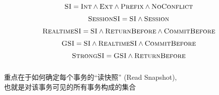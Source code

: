 \begin{frame}{}
  \[
	\textsc{SI} = \textsc{Int} \land \textsc{Ext} \land \textsc{Prefix} \land \textsc{NoConflict}
  \]
\end{frame}

\begin{frame}{}
  \[
	\textsc{SessionSI} = \textsc{SI} \land \textsc{Session}
  \]

  \pause
  \[
	\textsc{RealtimeSI} = \textsc{SI} \land \textsc{ReturnBefore} \land \textsc{CommitBefore}
  \]

  \pause
  \[
	\textsc{GSI} = \textsc{SI} \land \textsc{RealtimeSI} \land \textsc{CommitBefore}
  \]

  \pause
  \[
	\textsc{StrongSI} = \textsc{GSI} \land \textsc{ReturnBefore}
  \]
\end{frame}

\begin{frame}{}
  \begin{columns}
	  \begin{itemize}
	  	\item \ansisi
	  	\item \si
	  	\item \gsi
	  	\item \strongsi
	  	\item \strongsessionsi
	  	\item \parallelsi
	  	\item \wsi
	  	\item \nmsi
	  	\item \pcsi
	  \end{itemize}
  \end{columns}
\end{frame}

\begin{frame}{}
  \begin{center}

	\vspace{0.20cm}
	重点在于如何确定每个事务的``读快照'' (Read Snapshot), \\[5pt]
	也就是对该事务可见的所有事务构成的集合
  \end{center}
\end{frame}
